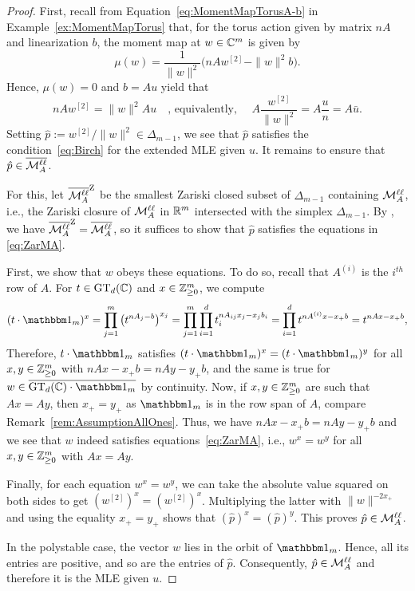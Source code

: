 \begin{proof}
	First, recall from Equation~\eqref{eq:MomentMapTorusA-b} in Example~\ref{ex:MomentMapTorus}	that, for the torus action given by matrix $nA$ and linearization $b$, the moment map at $w \in \mathbb C^m$ is given by
		\begin{equation}\label{eq:MomentMapLogLinear}
			\mu(w) = \frac{1}{\|w\|^2} \big( nAw^{[2]} - \|w\|^2 b \big) .
		\end{equation}
	Hence, $\mu(w) = 0$ and $b = Au$ yield that
		\[ nAw^{[2]} = \| w \|^2 Au \quad \text{, equivalently, } \quad 
		A \frac{w^{[2]}}{\|w\|^2} = A \frac{u}{n} = A \bar{u} . \]
	Setting $\hat{p} := w^{[2]}/ \|w\|^{2}  \in \Delta_{m-1}$, we see that $\hat{p}$ satisfies the condition~\eqref{eq:Birch} for the extended MLE given $u$. It remains to ensure that $\hat{p} \in \overline{\mathcal{M}^{\mathtt{\ell \ell}}_A}$.
	
	For this, let $\overline{\mathcal{M}^{\mathtt{\ell \ell}}_A}^{\operatorname{Z}}$ be the smallest Zariski closed subset of $\Delta_{m-1}$ containing $\mathcal{M}^{\mathtt{\ell \ell}}_A$, i.e., the Zariski closure of $\mathcal{M}^{\mathtt{\ell \ell}}_A$ in $\mathbb R^m$ intersected with the simplex $\Delta_{m-1}$. By \cite[Theorem 3.2]{GeigerMeekSturmfels}, we have $\overline{\mathcal{M}^{\mathtt{\ell \ell}}_A}^{\operatorname{Z}} = \overline{\mathcal{M}^{\mathtt{\ell \ell}}_A}$, so it suffices to show that $\hat{p}$ satisfies the equations in \eqref{eq:ZarMA}. 
	
	First, we show that $w$ obeys these equations. To do so, recall that $A^{(i)}$ is the $i^{th}$ row of $A$. For $t \in \operatorname{GT}_d(\mathbb C)$ and $x \in \mathbb Z_{\geq 0}^m$, we compute
		\begin{align*}
			(t \cdot \ones_m)^x = \prod_{j=1}^m \left( t^{nA_j  - b} \right)^{x_j}
			 = \prod_{j=1}^m \prod_{i=1}^d t_i^{n A_{ij} x_j - x_j b_i} 
			 = \prod_{i=1}^d t^{nA^{(i)} x - x_+ b} = t^{nAx - x_+ b},
		\end{align*}
	Therefore, $t \cdot \ones_m$ satisfies $(t \cdot \ones_m)^x = (t \cdot \ones_m)^y$ for all $x,y \in \mathbb Z_{\geq 0}^m$ with $n A x - x_+ b = n A y - y_+ b$, and the same is true for $w \in \overline{\GT_d(\CC) \cdot \ones_m}$ by continuity. 
	Now, if $x,y \in \mathbb Z_{\geq 0}^m$  are such that $Ax = Ay$, then $x_+ = y_+$ as $\ones_m$ is in the row span of $A$, compare Remark~\ref{rem:AssumptionAllOnes}. Thus, we have $n A x - x_+ b = n A y - y_+ b$ and we see that $w$ indeed satisfies equations~\eqref{eq:ZarMA}, i.e., $w^x = w^y$ for all $x,y \in \mathbb Z_{\geq 0}^m$  with $Ax = Ay$.
	
	Finally, for each equation $w^x = w^y$, we can take the absolute value squared on both sides to get $(w^{[2]})^x = (w^{[2]})^x$. Multiplying the latter with $\| w \|^{-2 x_+}$ and using the equality $x_+ = y_+$ shows that $(\hat{p})^x = (\hat{p})^y$. This proves $\hat{p} \in \mathcal{M}^{\mathtt{\ell \ell}}_A$.
	
	In the polystable case, the vector $w$ lies in the orbit of $\ones_m$. Hence, all its entries are positive, and so are the entries of $\hat{p}$. Consequently, $\hat{p} \in \mathcal{M}^{\mathtt{\ell \ell}}_A$ and therefore it is the MLE given $u$.
\end{proof}

